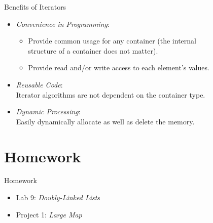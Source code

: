 \documentclass[14pt,aspectratio=1610]{beamer}
\begin{document}

\begin{frame}{Benefits of Iterators}
\begin{itemize}
\item<2->
  \emph{Convenience in Programming}:
  \begin{itemize}
  \item
    Provide common usage for any container (the internal\\ structure of a container does not matter).
  \item
    Provide read and/or write access to each element's values.
  \end{itemize}
\item<3->
  \emph{Reusable Code}:\\
  Iterator algorithms are not dependent on the container type.
\item<4->
  \emph{Dynamic Processing}:\\
  Easily dynamically allocate as well as delete the memory.
\end{itemize}
\end{frame}

\section*{Homework}

\begin{frame}{Homework}\Large
\begin{itemize}
\item Lab 9: \textit{Doubly-Linked Lists}
\item Project 1: \textit{Large Map}
\end{itemize}
\end{frame}
\end{document}
